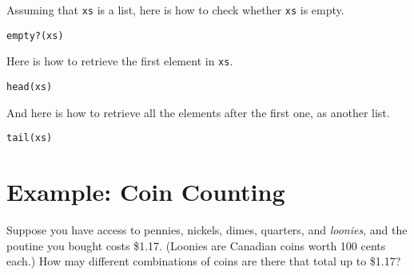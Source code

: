 \documentclass[10pt,oneside]{book}
\begin{document}
Assuming that \texttt{\frenchspacing xs} is a list, here is how to check whether \texttt{\frenchspacing xs} is empty.
\begin{lstlisting}
empty?(xs)
\end{lstlisting}
Here is how to retrieve the first element in \texttt{\frenchspacing xs}.
\begin{lstlisting}
head(xs)
\end{lstlisting}
And here is how to retrieve all the elements after the first one, as another list.
\begin{lstlisting}
tail(xs)
\end{lstlisting}

\section{Example: Coin Counting}
Suppose you have access to pennies, nickels, dimes, quarters, and {\em loonies}, and the poutine you bought costs \$1.17. (Loonies are Canadian coins worth 100 cents each.) How may different combinations of coins are there that total up to \$1.17? 
\end{document}
